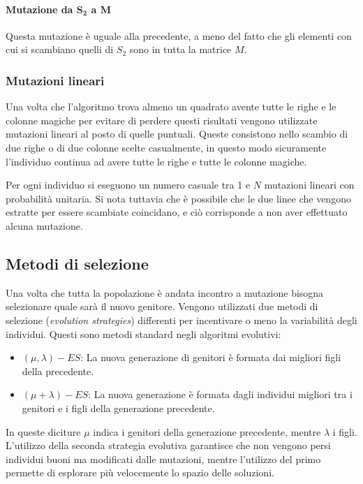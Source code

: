 \documentclass[italian,twoside,twocolumn]{article}
\begin{document}
\paragraph{Mutazione da $ \mathbf{S_2} $ a $ \mathbf{M} $}
Questa mutazione è uguale alla precedente, a meno del fatto che gli elementi con cui si scambiano quelli di $ S_2 $ sono in tutta la matrice $ M $.

\subsubsection{Mutazioni lineari}
Una volta che l'algoritmo trova almeno un quadrato avente tutte le righe e le colonne magiche per evitare di perdere questi risultati vengono utilizzate mutazioni lineari al posto di quelle puntuali. Queste consistono nello scambio di due righe o di due colonne scelte casualmente, in questo modo sicuramente l'individuo continua ad avere tutte le righe e tutte le colonne magiche. 

Per ogni individuo si eseguono un numero casuale tra 1 e $ N $ mutazioni lineari con probabilità unitaria. Si nota tuttavia che è possibile che le due linee che vengono estratte per essere scambiate coincidano, e ciò corrisponde a non aver effettuato alcuna mutazione. 

\subsection{Metodi di selezione}
Una volta che tutta la popolazione è andata incontro a mutazione bisogna selezionare quale sarà il nuovo genitore. Vengono utilizzati due metodi di selezione (\emph{evolution strategies}) differenti per incentivare o meno la variabilità degli individui. Questi sono metodi standard negli algoritmi evolutivi:
\begin{itemize}
	\item$ (\mu, \lambda)-ES $: La nuova generazione di genitori è formata dai migliori figli della precedente.
	\item $ (\mu + \lambda)-ES $: La nuova generazione è formata dagli individui migliori tra i genitori e i figli della generazione precedente.
\end{itemize}
In queste diciture $ \mu $ indica i genitori della generazione precedente, mentre $ \lambda $ i figli. 
L'utilizzo della seconda strategia evolutiva garantisce che non vengono persi individui buoni ma modificati dalle mutazioni, mentre l'utilizzo del primo permette di esplorare più velocemente lo spazio delle soluzioni. 
\end{document}
